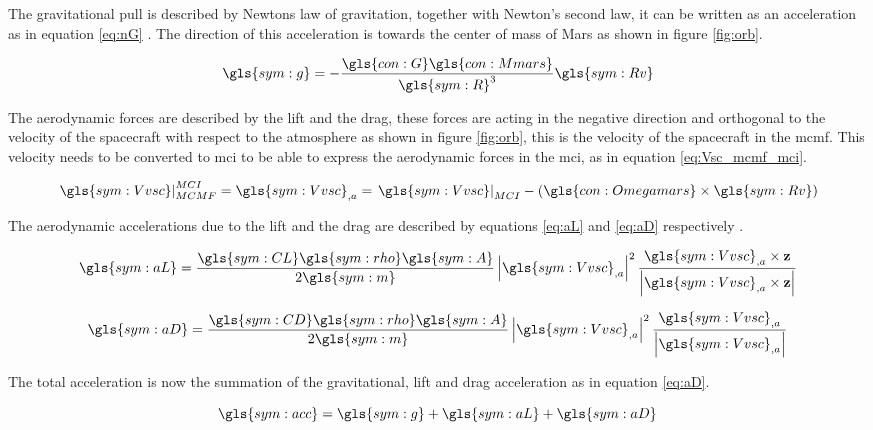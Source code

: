 The gravitational pull is described by Newtons law of gravitation, together with Newton's second law, it can be written as an acceleration as in equation \ref{eq:nG} \cite{Weiland2004}. The direction of this acceleration is towards the center of mass of Mars as shown in figure \ref{fig:orb}.

\begin{equation} \label{eq:nG}
\gls{sym:g} = -\frac{\gls{con:G}\gls{con:Mmars}}
					{\gls{sym:R}^3}\gls{sym:Rv}
\end{equation}

The aerodynamic forces are described by the lift and the drag, these forces are acting in the negative direction and orthogonal to the velocity of the spacecraft with respect to the atmosphere as shown in figure \ref{fig:orb}, this is the velocity of the spacecraft in the \gls{mcmf}. This velocity needs to be converted to \gls{mci} to be able to express the aerodynamic forces in the \gls{mci}, as in equation \ref{eq:Vsc_mcmf_mci}.

\begin{equation} \label{eq:Vsc_mcmf_mci}
\left.\gls{sym:Vvsc}\right|_{MCMF}^{MCI} = \gls{sym:Vvsc}_{,a} = \left.\gls{sym:Vvsc}\right|_{MCI} - \left(\gls{con:Omegamars} \times \gls{sym:Rv} \right)
\end{equation}

The aerodynamic accelerations due to the lift and the drag are described by equations \ref{eq:aL} and \ref{eq:aD} respectively \cite{AndersonJr.2007}.

\begin{equation} \label{eq:aL}
\gls{sym:aL} = \frac{\gls{sym:CL}\gls{sym:rho}\gls{sym:A}}{2 \gls{sym:m}} 
				\left|\gls{sym:Vvsc}_{,a}\right|^2
				\frac{\gls{sym:Vvsc}_{,a} \times \mathbf{z}}
				{\left| \gls{sym:Vvsc}_{,a} \times \mathbf{z}\right|}
\end{equation}

\begin{equation} \label{eq:aD}
\gls{sym:aD} = \frac{\gls{sym:CD}\gls{sym:rho}\gls{sym:A}}{2 \gls{sym:m}}
				\left|\gls{sym:Vvsc}_{,a}\right|^2 \frac{\gls{sym:Vvsc}_{,a}}{\left|\gls{sym:Vvsc}_{,a}\right|}
\end{equation}

The total acceleration is now the summation of the gravitational, lift and drag acceleration as in equation \ref{eq:aD}.

\begin{equation} \label{eq:acc}
\gls{sym:acc} = \gls{sym:g} + \gls{sym:aL} + \gls{sym:aD}
\end{equation}

